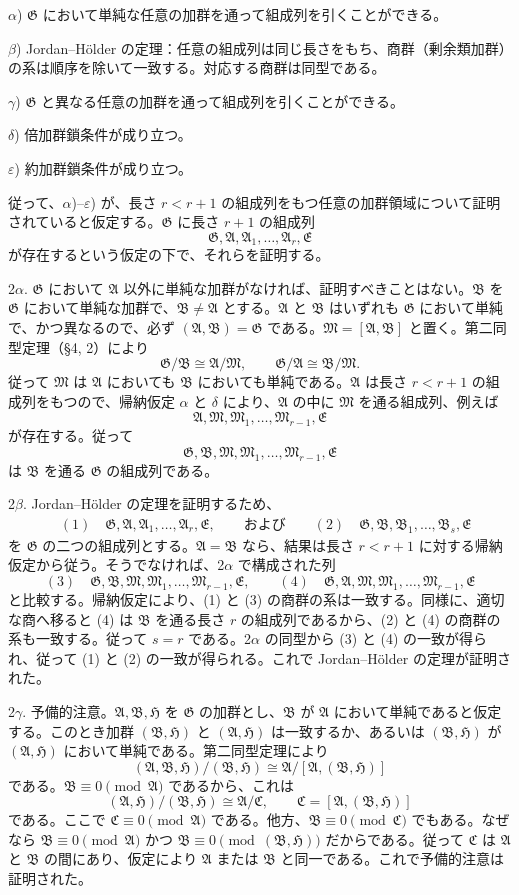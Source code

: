 \documentclass[11pt]{article}
\providecommand{\mM}{\mathfrak{M}}
\providecommand{\mA}{\mathfrak{A}}
\providecommand{\mB}{\mathfrak{B}}
\providecommand{\mC}{\mathfrak{C}}
\providecommand{\mE}{\mathfrak{E}}
\providecommand{\mG}{\mathfrak{G}}
\providecommand{\mH}{\mathfrak{H}}
\begin{document}
$\alpha$) $\mG$ において単純な任意の加群を通って組成列を引くことができる。

$\beta$) Jordan--Hölder の定理：任意の組成列は同じ長さをもち、商群（剰余類加群）の系は順序を除いて一致する。対応する商群は同型である。

$\gamma$) $\mG$ と異なる任意の加群を通って組成列を引くことができる。

$\delta$) 倍加群鎖条件が成り立つ。

$\varepsilon$) 約加群鎖条件が成り立つ。

従って、$\alpha$)--$\varepsilon$) が、長さ $r<r+1$ の組成列をもつ任意の加群領域について証明されていると仮定する。$\mG$ に長さ $r+1$ の組成列
\[
        \mG,\mA,\mA_1,\ldots,\mA_r,\mE
\]
が存在するという仮定の下で、それらを証明する。

2$\alpha$. $\mG$ において $\mA$ 以外に単純な加群がなければ、証明すべきことはない。$\mB$ を $\mG$ において単純な加群で、$\mB\ne\mA$ とする。$\mA$ と $\mB$ はいずれも $\mG$ において単純で、かつ異なるので、必ず $(\mA,\mB)=\mG$ である。$\mM=[\mA,\mB]$ と置く。第二同型定理（§4, 2）により
\[
        \mG/\mB\cong \mA/\mM,
        \qquad
        \mG/\mA\cong \mB/\mM.
\]
従って $\mM$ は $\mA$ においても $\mB$ においても単純である。$\mA$ は長さ $r<r+1$ の組成列をもつので、帰納仮定 $\alpha$ と $\delta$ により、$\mA$ の中に $\mM$ を通る組成列、例えば
\[
        \mA,\mM,\mM_1,\ldots,\mM_{r-1},\mE
\]
が存在する。従って
\[
        \mG,\mB,\mM,\mM_1,\ldots,\mM_{r-1},\mE
\]
は $\mB$ を通る $\mG$ の組成列である。

2$\beta$. Jordan--Hölder の定理を証明するため、
\[
\begin{aligned}
&(1)\quad \mG,\mA,\mA_1,\ldots,\mA_r,\mE,\qquad\text{および}\qquad
(2)\quad \mG,\mB,\mB_1,\ldots,\mB_s,\mE
\end{aligned}
\]
を $\mG$ の二つの組成列とする。$\mA=\mB$ なら、結果は長さ $r<r+1$ に対する帰納仮定から従う。そうでなければ、2$\alpha$ で構成された列
\[
        (3)\quad \mG,\mB,\mM,\mM_1,\ldots,\mM_{r-1},\mE,
        \qquad
        (4)\quad \mG,\mA,\mM,\mM_1,\ldots,\mM_{r-1},\mE
\]
と比較する。帰納仮定により、(1) と (3) の商群の系は一致する。同様に、適切な商へ移ると (4) は $\mB$ を通る長さ $r$ の組成列であるから、(2) と (4) の商群の系も一致する。従って $s=r$ である。2$\alpha$ の同型から (3) と (4) の一致が得られ、従って (1) と (2) の一致が得られる。これで Jordan--Hölder の定理が証明された。

2$\gamma$. 予備的注意。$\mA,\mB,\mH$ を $\mG$ の加群とし、$\mB$ が $\mA$ において単純であると仮定する。このとき加群 $(\mB,\mH)$ と $(\mA,\mH)$ は一致するか、あるいは $(\mB,\mH)$ が $(\mA,\mH)$ において単純である。第二同型定理により
\[
        (\mA,\mB,\mH)/(\mB,\mH)
        \cong
        \mA/[\mA,(\mB,\mH)]
\]
である。$\mB\equiv0\pmod{\mA}$ であるから、これは
\[
        (\mA,\mH)/(\mB,\mH)\cong \mA/\mC,
        \qquad \mC=[\mA,(\mB,\mH)]
\]
である。ここで $\mC\equiv0\pmod{\mA}$ である。他方、$\mB\equiv0\pmod{\mC}$ でもある。なぜなら $\mB\equiv0\pmod{\mA}$ かつ $\mB\equiv0\pmod{(\mB,\mH)}$ だからである。従って $\mC$ は $\mA$ と $\mB$ の間にあり、仮定により $\mA$ または $\mB$ と同一である。これで予備的注意は証明された。
\end{document}
